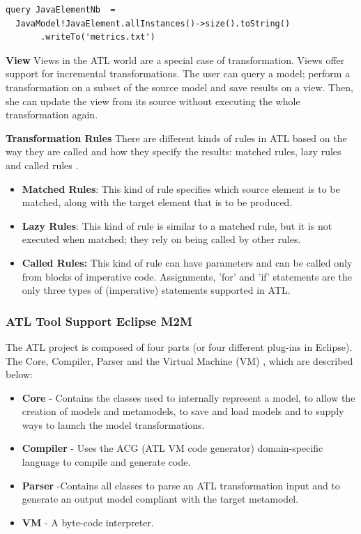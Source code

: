 \vspace{\baselineskip}
\begin{lstlisting}[style=umplePlain]
query JavaElementNb  =
  JavaModel!JavaElement.allInstances()->size().toString()
       .writeTo('metrics.txt')
\end{lstlisting}


\textbf{View}
Views in the ATL world are a special case of transformation. Views offer support for incremental transformations. The user can query a model; perform a transformation on a subset of the source model and save results on a view. Then, she can update the view from its source without executing the whole transformation again. 

\textbf{Transformation Rules}
There are different kinds of rules in ATL based on the way they are called and how they specify the results: matched rules, lazy rules and called rules \cite{stephan2009comparative}.

\begin{itemize}
\item \textbf{Matched Rules}: 	This kind of rule specifies which source element is to be matched, along with the target element that is to be produced.

\item \textbf{Lazy Rules}: This kind of rule is similar to a matched rule, but it is not executed when matched; they rely on being called by other rules.

\item \textbf{Called Rules:}	This kind of rule can have parameters and can be called only from blocks of imperative code. Assignments, 'for' and 'if' statements are the only three types of (imperative) statements supported in ATL.

\end{itemize}

\subsubsection{ATL Tool Support \textemdash Eclipse M2M}
The ATL project is composed of four parts (or four different plug-ins in Eclipse). The Core, Compiler, Parser and the Virtual Machine (VM) \cite{Jouault200831}, which are described below:

\begin{itemize}
\item \textbf{Core} - Contains the classes used to internally represent a model, to allow the creation of models and metamodels, to save and load models and to supply ways to launch the model transformations. 
\item \textbf{Compiler} - Uses the ACG (ATL VM code generator) domain-specific language to compile and generate code. 
\item \textbf{Parser} -Contains all classes to parse an ATL transformation input and to generate an output model compliant with the target metamodel.
\item \textbf{VM} - A byte-code interpreter.
\end{itemize}

